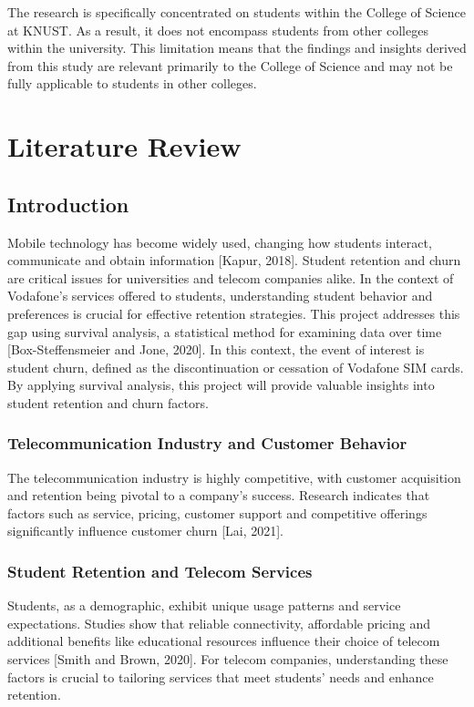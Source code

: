 \documentclass[doublespacing,12pt]{report}
\begin{document}
The research is specifically concentrated on students within the College of Science at KNUST. As a result, it does not encompass students from other colleges within the university. This limitation means that the findings and insights derived from this study are relevant primarily to the College of Science and may not be fully applicable to students in other colleges.

\newpage
\chapter{Literature Review}


\section{Introduction}
Mobile technology has become widely used, changing how students interact, communicate and obtain information [Kapur, 2018]. Student retention and churn are critical issues for universities and telecom companies alike. In the context of Vodafone's services offered to students, understanding student behavior and preferences is crucial for effective retention strategies. This project addresses this gap using survival analysis, a statistical method for examining data over time [Box-Steffensmeier and Jone, 2020]. In this context, the event of interest is student churn, defined as the discontinuation or cessation of Vodafone SIM cards. By applying survival analysis, this project will provide valuable insights into student retention and churn factors.

\subsection{Telecommunication Industry and Customer Behavior}
The telecommunication industry is highly competitive, with customer acquisition and retention being pivotal to a company's success. Research indicates that factors such as service, pricing, customer support and competitive offerings significantly influence customer churn [Lai, 2021].

\subsection{Student Retention and Telecom Services}
Students, as a demographic, exhibit unique usage patterns and service expectations. Studies show that reliable connectivity, affordable pricing and additional benefits like educational resources influence their choice of telecom services [Smith and Brown, 2020]. For telecom companies, understanding these factors is crucial to tailoring services that meet students’ needs and enhance retention.
\end{document}
